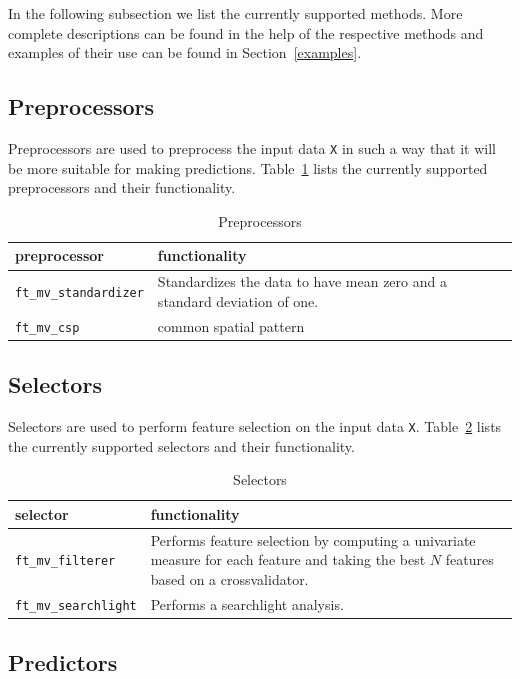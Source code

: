 \documentclass{article}
\renewcommand{\t}[1]{{\tt #1}}
\begin{document}
In the following subsection we list the currently supported methods. More complete descriptions can be found in the help of the respective methods and examples of their use can be found in Section~\ref{examples}.

\subsection{Preprocessors}

Preprocessors are used to preprocess the input data \t{X} in such a way that it will be more suitable for making predictions. Table~\ref{preprocessors} lists the currently supported preprocessors and their functionality.

\begin{table}[ht]
\centering
\caption{Preprocessors}
\begin{tabular}{p{}|p{}}
\bf{preprocessor} & \bf{functionality}\\
\hline
\t{ft\_mv\_standardizer} & Standardizes the data to have mean zero and a standard deviation of one.\\
\t{ft\_mv\_csp} & common spatial pattern
\end{tabular}
\label{preprocessors}
\end{table}

\subsection{Selectors}

Selectors are used to perform feature selection on the input data \t{X}. Table~\ref{selectors} lists the currently supported selectors and their functionality.

\begin{table}[ht]
\centering
\caption{Selectors}
\begin{tabular}{p{}|p{}}
\bf{selector} & \bf{functionality}\\
\hline
\t{ft\_mv\_filterer} & Performs feature selection by computing a univariate measure for each feature and taking the best $N$ features based on a crossvalidator.\\
\t{ft\_mv\_searchlight} & Performs a searchlight analysis.
\end{tabular}
\label{selectors}
\end{table}

\subsection{Predictors}
\end{document}
